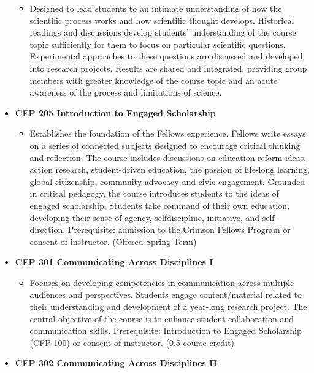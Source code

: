 \documentclass[
  letterpaper,
]{scrbook}
\providecommand{\tightlist}{%
  \setlength{\itemsep}{0pt}\setlength{\parskip}{0pt}}
\begin{document}
\begin{itemize}
  \begin{itemize}
  \tightlist
  \item
    Designed to lead students to an intimate understanding of how the
    scientific process works and how scientific thought develops.
    Historical readings and discussions develop students' understanding
    of the course topic sufficiently for them to focus on particular
    scientific questions. Experimental approaches to these questions are
    discussed and developed into research projects. Results are shared
    and integrated, providing group members with greater knowledge of
    the course topic and an acute awareness of the process and
    limitations of science.
  \end{itemize}
\item
  \textbf{CFP 205 Introduction to Engaged Scholarship}

  \begin{itemize}
  \tightlist
  \item
    Establishes the foundation of the Fellows experience. Fellows write
    essays on a series of connected subjects designed to encourage
    critical thinking and reflection. The course includes discussions on
    education reform ideas, action research, student-driven education,
    the passion of life-long learning, global citizenship, community
    advocacy and civic engagement. Grounded in critical pedagogy, the
    course introduces students to the ideas of engaged scholarship.
    Students take command of their own education, developing their sense
    of agency, selfdiscipline, initiative, and self-direction.
    Prerequisite: admission to the Crimson Fellows Program or consent of
    instructor. (Offered Spring Term)
  \end{itemize}
\item
  \textbf{CFP 301 Communicating Across Disciplines I}

  \begin{itemize}
  \tightlist
  \item
    Focuses on developing competencies in communication across multiple
    audiences and perspectives. Students engage content/material related
    to their understanding and development of a year-long research
    project. The central objective of the course is to enhance student
    collaboration and communication skills. Prerequisite: Introduction
    to Engaged Scholarship (CFP-100) or consent of instructor. (0.5
    course credit)
  \end{itemize}
\item
  \textbf{CFP 302 Communicating Across Disciplines II}


\end{itemize}
\end{document}

